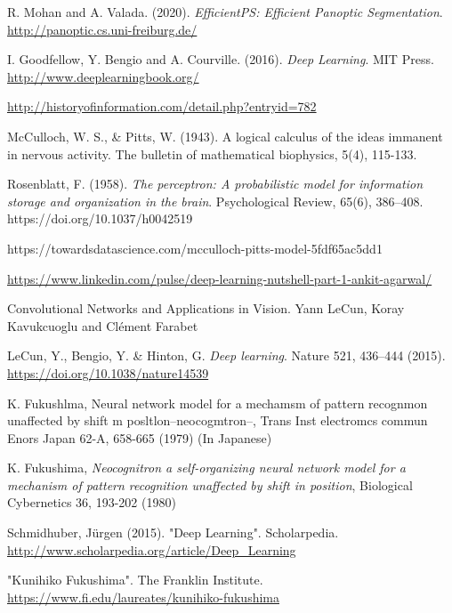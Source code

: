 

\begin{thebibliography}{}



 R. Mohan and A. Valada. (2020). \textit{EfficientPS: Efficient Panoptic Segmentation}. \url{http://panoptic.cs.uni-freiburg.de/}

 I. Goodfellow, Y. Bengio and A. Courville. (2016). \textit{Deep Learning}. MIT Press. \url{http://www.deeplearningbook.org/}



 \url{http://historyofinformation.com/detail.php?entryid=782}

 McCulloch, W. S., \& Pitts, W. (1943). A logical calculus of the ideas immanent in nervous activity. The bulletin of mathematical biophysics, 5(4), 115-133.

 Rosenblatt, F. (1958). \textit{The perceptron: A probabilistic model for information storage and organization in the brain}. Psychological Review, 65(6), 386–408. https://doi.org/10.1037/h0042519

 https://towardsdatascience.com/mcculloch-pitts-model-5fdf65ac5dd1

 \url{https://www.linkedin.com/pulse/deep-learning-nutshell-part-1-ankit-agarwal/}

 Convolutional Networks and Applications in Vision. Yann LeCun, Koray Kavukcuoglu and Cl\'ement Farabet

 LeCun, Y., Bengio, Y. \& Hinton, G. \textit{Deep learning}. Nature 521, 436–444 (2015). \url{https://doi.org/10.1038/nature14539}

 K. Fukushlma, Neural network model for a mechamsm
of pattern recognmon unaffected by shift m
posltlon--neocogmtron--, Trans Inst electromcs commun
Enors Japan 62-A, 658-665 (1979) (In Japanese)

 K. Fukushima, \textit{Neocognitron a self-organizing neural
network model for a mechanism of pattern recognition
unaffected by shift in position}, Biological Cybernetics 36,
193-202 (1980)

 Schmidhuber, Jürgen (2015). "Deep Learning". Scholarpedia. \url{http://www.scholarpedia.org/article/Deep_Learning}

 "Kunihiko Fukushima". The Franklin Institute. \url{https://www.fi.edu/laureates/kunihiko-fukushima}


\end{thebibliography}
